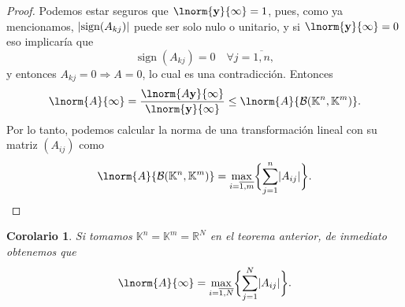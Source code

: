 \documentclass[11pt]{article}
\renewcommand{\vec}{\mathbf} %
\newcommand{\R}{\mathbb R}
\DeclarePairedDelimiter{\abs}{\lvert }{\rvert}
\newtheorem{corollary}{Corolario}
\DeclareMathOperator{\sign}{sign}
\begin{document}
\begin{Answer}
\begin{proof}
	Podemos estar seguros que $\lnorm{\vec y}{\infty} = 1$, pues, como ya mencionamos,  $\abs{\sign(A_{kj})}$ puede ser solo nulo o unitario, y si $\lnorm{\vec y}{\infty} = 0$ eso implicaría que
	\begin{equation}
		\sign(A_{kj}) = 0 \quad \forall j = \overline{1, n},
	\end{equation}
	y entonces $A_{kj} = 0 \Longrightarrow A = 0$, lo cual es una contradicción.
	Entonces
	\begin{equation}
		\lnorm{A}{\infty} = \frac{\lnorm{A\vec y}{\infty}}{\lnorm{\vec y}{\infty}} \le \lnorm{A}{{\mathcal B(\mathbb K^n, \mathbb K^m)}}.
	\end{equation}
	Por lo tanto, podemos calcular la norma de una transformación lineal con su matriz $(A_{ij})$ como
	\begin{equation}
		\lnorm{A}{{\mathcal B(\mathbb K^n, \mathbb K^m)}} = \max_{i = \overline{1,m}} \biggl\{ \sum_{j=1}^n \abs{A_{ij}}\biggr\}.
	\end{equation}
	\end{proof}
	
	\begin{corollary}
		Si tomamos $\mathbb K^n = \mathbb K^m = \R^N$ en el teorema anterior, de inmediato obtenemos que
		\begin{equation}
			\lnorm{A}{\infty} =  \max_{i = \overline{1,N}} \biggl\{ \sum_{j=1}^N \abs{A_{ij}}\biggr\}.
		\end{equation}
	\end{corollary}
\end{Answer}
\end{document}
